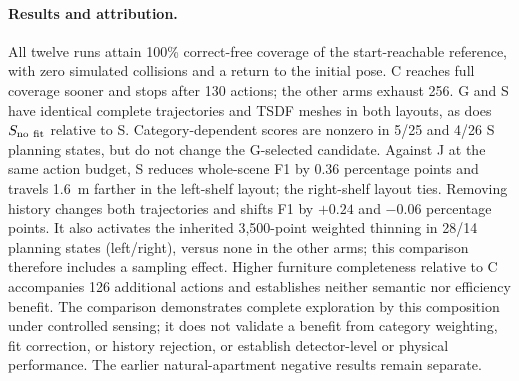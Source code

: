 \paragraph{Results and attribution.}
All twelve runs attain 100\% correct-free coverage of the start-reachable reference, with zero simulated collisions and a return to the initial pose. C reaches full coverage sooner and stops after 130 actions; the other arms exhaust 256. G and S have identical complete trajectories and TSDF meshes in both layouts, as does $S_{\rm no\ fit}$ relative to S. Category-dependent scores are nonzero in 5/25 and 4/26 S planning states, but do not change the G-selected candidate. Against J at the same action budget, S reduces whole-scene F1 by 0.36 percentage points and travels 1.6~m farther in the left-shelf layout; the right-shelf layout ties. Removing history changes both trajectories and shifts F1 by $+0.24$ and $-0.06$ percentage points. It also activates the inherited 3,500-point weighted thinning in 28/14 planning states (left/right), versus none in the other arms; this comparison therefore includes a sampling effect. Higher furniture completeness relative to C accompanies 126 additional actions and establishes neither semantic nor efficiency benefit. The comparison demonstrates complete exploration by this composition under controlled sensing; it does not validate a benefit from category weighting, fit correction, or history rejection, or establish detector-level or physical performance. The earlier natural-apartment negative results remain separate.

